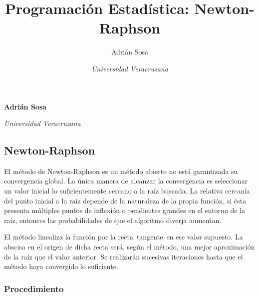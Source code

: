\documentclass[11pt,]{article}
\title{Programación Estadística: Newton-Raphson  }
\author{\Large Adrián Sosa\vspace{0.05in} \newline\normalsize\emph{}   \and \Large \vspace{0.05in} \newline\normalsize\emph{Universidad Veracruzana}  }
\date{}
\newcommand*{\authorfont}{\fontfamily{phv}\selectfont}
\begin{document}
	
%

{%
\setlength{\parindent}{0pt}
\thispagestyle{plain}
{\fontsize{18}{20}\selectfont\raggedright 
\maketitle  %

}

{
   \vskip 13.5pt\relax \normalsize\fontsize{11}{12} 
\textbf{\authorfont Adrián Sosa} \hskip 15pt \emph{\small }   \par \textbf{\authorfont } \hskip 15pt \emph{\small Universidad Veracruzana}   
}

}






\vskip -8.5pt



\noindent  

\hypertarget{newton-raphson}{%
\subsection{Newton-Raphson}\label{newton-raphson}}

El método de Newton-Raphson es un método abierto no está garantizada su
convergencia global. La única manera de alcanzar la convergencia es
seleccionar un valor inicial lo suficientemente cercano a la raíz
buscada. La relativa cercanía del punto inicial a la raíz depende de la
naturaleza de la propia función, si ésta presenta múltiples puntos de
inflexión o pendientes grandes en el entorno de la raíz, entonces las
probabilidades de que el algoritmo diverja aumentan.

El método linealiza la función por la recta~tangente~en ese valor
supuesto. La abscisa en el origen de dicha recta será, según el método,
una mejor aproximación de la raíz que el valor anterior. Se realizarán
sucesivas iteraciones hasta que el método haya convergido lo suficiente.

\hypertarget{procedimiento}{%
\subsubsection{Procedimiento}\label{procedimiento}}
\end{document}
